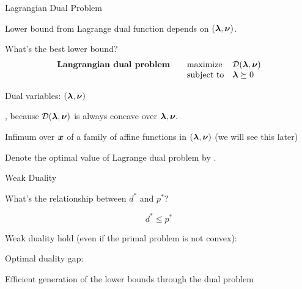 \documentclass[handout,fleqn,aspectratio=169]{beamer}
\begin{document}
\begin{frame}{Lagrangian Dual Problem}

\plitemsep 0.1in

\bci 

\item Lower bound from Lagrange dual function depends on
$(\bm{\lambda},\bm{\nu})$. 

\item \question What's the best lower bound? 
\[
\begin{array}{lll}
\text{\bf Langrangian dual problem} \quad & \mbox{maximize} & {\cal D}(\bm{\lambda},\bm{\nu}) \\
 & \mbox{subject to} & \bm{\lambda}\succeq 0
\end{array}
\]

\item Dual variables: $(\bm{\lambda},\bm{\nu})$

\item {}, because ${\cal D}(\bm{\lambda},\bm{\nu})$ is always concave over $\bm{\lambda},\bm{\nu}.$

\bci
\item Infimum over $\bm{x}$ of a family of affine functions in $(\bm{\lambda},\bm{\nu})$ (we will see this later)
\eci

\item Denote the optimal value of Lagrange dual problem by .

\eci
\end{frame}

\begin{frame}{Weak Duality}

\plitemsep 0.15in

\bci 

\item What's the relationship between $d^{*}$ and $p^{*}$?

{
\[
d^{*}\leq p^{*}
\]
\vspace{-0.3cm}
}

\item Weak duality  hold (even if the primal problem is
not convex):

\item Optimal duality gap: 


\item Efficient generation of the lower bounds through the dual problem


\eci
\end{frame}
\end{document}
